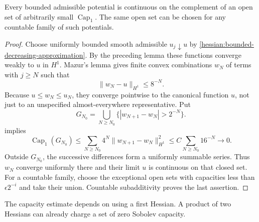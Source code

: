 \begin{lemma}\label{hessian:bounded-sobolev-quasicontinuity}
Every bounded admissible potential is continuous on the
complement of an open set of arbitrarily small $\operatorname{Cap}_1$.
The same open set can be chosen for any countable family of such
potentials.
\end{lemma}
\begin{proof}
Choose uniformly bounded smooth admissible $u_j\downarrow u$ by
\cref{hessian:bounded-decreasing-approximation}. By the preceding lemma
these functions converge weakly to $u$ in $H^1$. Mazur's lemma gives
finite convex combinations $w_N$ of terms with $j\geq N$ such that
\[
 \|w_N-u\|_{H^1}\leq8^{-N}.
\]
Because $u\leq w_N\leq u_N$, they converge pointwise to the canonical
function $u$, not just to an unspecified almost-everywhere representative.
Put
\[
 G_{N_0}=\bigcup_{N\geq N_0}
                  \{|w_{N+1}-w_N|>2^{-N}\}.
\]
 implies
\[
 \operatorname{Cap}_1(G_{N_0})
 \leq\sum_{N\geq N_0}4^N\|w_{N+1}-w_N\|_{H^1}^2
 \leq C\sum_{N\geq N_0}16^{-N}\longrightarrow0.
\]
Outside $G_{N_0}$, the successive differences form a uniformly summable
series. Thus $w_N$ converge uniformly there and their limit $u$ is
continuous on that closed set. For a countable family, choose the
exceptional open sets with capacities less than $\epsilon2^{-i}$ and
take their union. Countable subadditivity proves the last assertion.
\end{proof}

The capacity estimate depends on using a first Hessian. A product
of two Hessians can already charge a set of zero Sobolev capacity.

